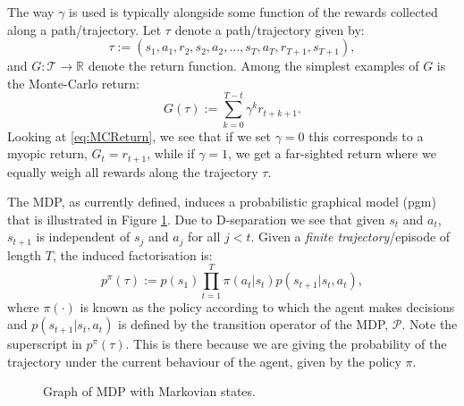 \documentclass{report}
\newcommand{\reals}{\mbox{\(\mathbb R\)}}
\numberwithin{equation}{section}
\numberwithin{figure}{section}
\numberwithin{table}{section}
\begin{document}
The way $\gamma$ is used is typically alongside some function of 
the rewards collected along a path/trajectory. Let $\tau$ denote a 
path/trajectory given by:
\begin{equation}
  \tau:=(s_1, a_1, r_2, s_2, a_2, \ldots, s_T, a_T, r_{T+1}, s_{T+1}),\label{eq:tau} 
\end{equation} 
and $G:\mathcal{T}\rightarrow \reals$ denote the return 
function. Among the simplest examples of $G$ is the Monte-Carlo 
return:
\begin{equation}
  G(\tau):=\sum_{k=0}^{T-t}\gamma^kr_{t+k+1}.\label{eq:MCReturn}
\end{equation}
Looking at \eqref{eq:MCReturn}, we see that if we set $\gamma=0$ 
this corresponds to a myopic return, $G_t=r_{t+1}$, while if 
$\gamma=1$, we get a far-sighted return where we equally weigh 
all rewards along the trajectory $\tau$.

The MDP, as currently defined, induces a probabilistic graphical model 
(pgm) that is illustrated in Figure \ref{fig:MDP}. Due to D-separation 
we see that given $s_t$ and  $a_t$, $s_{t+1}$ is independent of 
$s_j$ and $a_j$ for all $j<t$.
Given a \textit{finite trajectory}/episode of length $T$, the induced 
factorisation is:
\begin{equation}
  p^{\pi}(\tau):=p(s_1)\prod_{t=1}^T \pi(a_t|s_t)p(s_{t+1}|s_t,a_t),
\end{equation}
where $\pi(\cdot)$ is known as the policy according to which the 
agent makes decisions and $p(s_{t+1}|s_t, a_t)$ is defined by the 
transition operator of the MDP, $\mathcal{P}$. Note the superscript 
in $p^{\pi}(\tau)$. This is there because we are giving the probability 
of the trajectory under the current behaviour of the agent, given 
by the policy $\pi$.

\begin{figure}[H]
  \centering
  \caption{\label{fig:MDP} Graph of MDP with Markovian states.}
\end{figure}
\end{document}
